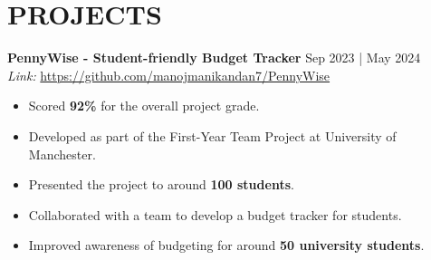 \documentclass[a4paper,1.5pt]{extarticle}
\begin{document}

\section*{PROJECTS}
\noindent
\textbf{PennyWise - Student-friendly Budget Tracker} \hfill Sep 2023 | May 2024 \\ %
\textit{Link:} \url{https://github.com/manojmanikandan7/PennyWise}
\begin{itemize}
    \item Scored \textbf{92\%} for the overall project grade.
    \item Developed as part of the First-Year Team Project at University of Manchester.
    \item Presented the project to around \textbf{100 students}.
    \item Collaborated with a team to develop a budget tracker for students.
    \item Improved awareness of budgeting for around \textbf{50 university students}.
\end{itemize}

\end{document}
